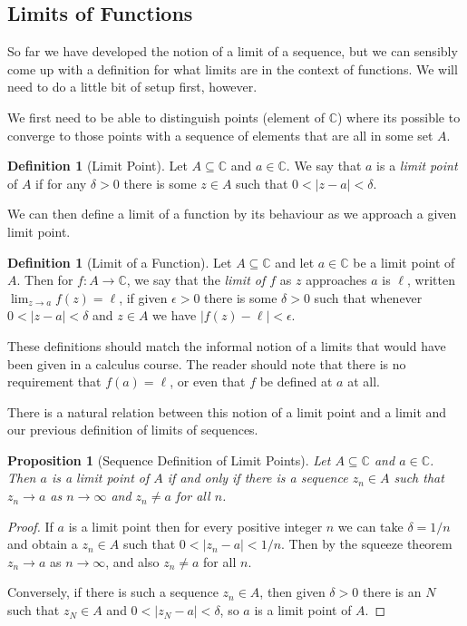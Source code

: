 \documentclass[11pt, a4paper]{article}
\newtheorem{proposition}[theorem]{Proposition}
\theoremstyle{definition}
\newtheorem{definition}[theorem]{Definition}
\newcommand{\vocab}[1]{\emph{#1}} %
\newcommand{\C}{\mathbb{C}}
\begin{document}
\subsection{Limits of Functions}\label{sec:lim-of-func}

So far we have developed the notion of a limit of a sequence, but we can sensibly come up with a definition for what limits are in the context of functions. We will need to do a little bit of setup first, however.

We first need to be able to distinguish points (element of $\C$) where its possible to converge to those points with a sequence of elements that are all in some set $A$.

\begin{definition}[Limit Point]
	Let $A \subseteq \C$ and $a \in \C$. We say that $a$ is a \vocab{limit point} of $A$ if for any $\delta > 0$ there is some $z \in A$ such that $0 < |z - a| < \delta$.
\end{definition}

We can then define a limit of a function by its behaviour as we approach a given limit point.

\begin{definition}[Limit of a Function]
	Let $A \subseteq \C$ and let $a \in \C$ be a limit point of $A$. Then for $f: A \rightarrow \C$, we say that the \vocab{limit of $f$} as $z$ approaches $a$ is $\ell$, written $\displaystyle\lim_{z \to a} f(z) = \ell$, if given $\epsilon > 0$ there is some $\delta > 0$ such that whenever $0 < |z - a| < \delta$ and $z \in A$ we have $|f(z) - \ell| < \epsilon$.
\end{definition}


These definitions should match the informal notion of a limits that would have been given in a calculus course. The reader should note that there is no requirement that $f(a) = \ell$, or even that $f$ be defined at $a$ at all.

There is a natural relation between this notion of a limit point and a limit and our previous definition of limits of sequences.

\begin{proposition}[Sequence Definition of Limit Points]
	Let $A \subseteq \C$ and $a \in \C$. Then $a$ is a limit point of $A$ if and only if there is a sequence $z_n \in A$ such that $z_n \rightarrow a$ as $n \rightarrow \infty$ and $z_n \neq a$ for all $n$. 
\end{proposition}
\begin{proof}
	If $a$ is a limit point then for every positive integer $n$ we can take $\delta = 1/n$ and obtain a $z_n \in A$ such that $0 < |z_n - a| < 1/n$. Then by the squeeze theorem $z_n \rightarrow a$ as $n \rightarrow \infty$, and also $z_n \neq a$ for all $n$.

	Conversely, if there is such a sequence $z_n \in A$, then given $\delta > 0$ there is an $N$ such that $z_N \in A$ and $0 < |z_N - a| < \delta$, so $a$ is a limit point of $A$.
\end{proof}
\end{document}
